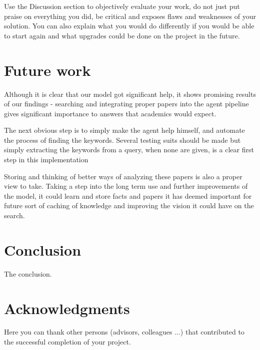 \documentclass[fleqn,moreauthors,10pt]{ds_report}
\begin{document}
Use the Discussion section to objectively evaluate your work, do not just put praise on everything you did, be critical and exposes flaws and weaknesses of your solution. You can also explain what you would do differently if you would be able to start again and what upgrades could be done on the project in the future.

\section*{Future work}

Although it is clear that our model got significant help, it shows promising results of our findings - searching and integrating proper papers into the agent pipeline gives significant importance to answers that academics would expect.

The next obvious step is to simply make the agent help himself, and automate the process of finding the keywords. Several testing suits should be made but simply extracting the keywords from a query, when none are given, is a clear first step in this implementation

Storing and thinking of better ways of analyzing these papers is also a proper view to take. Taking a step into the long term use and further improvements of the model, it could learn and store facts and papers it has deemed important for future sort of caching of knowledge and improving the vision it could have on the search.




\section*{Conclusion}
The conclusion.


\section*{Acknowledgments}

Here you can thank other persons (advisors, colleagues ...) that contributed to the successful completion of your project.




\end{document}
